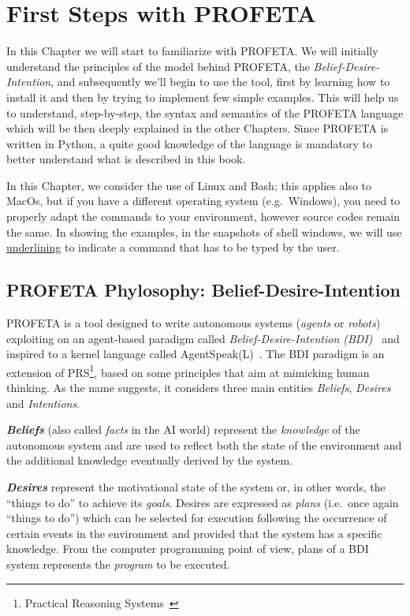 \chapter{First Steps with PROFETA}
In this Chapter we will start to familiarize with PROFETA.
We will initially understand the principles of the model behind PROFETA, the
\emph{Belief-Desire-Intention}, and subsequently we'll begin to use the
tool, first by learning how to install it and then by trying to implement
few simple examples.
This will help us to understand, step-by-step, the syntax and semantics of
the PROFETA language which will be then deeply explained in the other
Chapters.
Since PROFETA is written in Python, a quite good knowledge of the language
is mandatory to better understand what is described in this book.

In this Chapter, we consider the use of Linux and Bash; this applies also
to MacOs, but if you
have a different operating system (e.g.~Windows), you need to properly
adapt the commands to your environment, however source codes remain the
same.
In showing the examples, in the snapshots of shell windows, we will use
\underline{underlining} to indicate a command that has to be typed by the
user.



\section{PROFETA Phylosophy: Belief-Desire-Intention}
PROFETA is a tool designed to write autonomous systems (\emph{agents} or
\emph{robots}) exploiting on an
agent-based paradigm called
\emph{Belief-Desire-Intention (BDI)}~\cite{rao1995bdi} and inspired to a
kernel language called AgentSpeak(L)~\cite{AgentSpeak}.
The BDI paradigm is an extension of PRS\footnote{Practical Reasoning
  Systems~\cite{PRSarchitecture}}, based on some principles that aim at
mimicking human thinking.
As the name suggests, it considers three main entities \emph{Beliefs},
\emph{Desires} and \emph{Intentions}.

\textbf{\emph{Beliefs}} (also called \emph{facts} in the AI world)
represent the
\emph{knowledge} of the autonomous system and
are used to reflect both the state of the environment and the additional
knowledge eventually derived by the system.

\textbf{\emph{Desires}} represent the motivational state of the system or,
in other words, the ``things to do'' to achieve its \emph{goals}.
Desires are expressed as \emph{plans} (i.e.~once again
``things to do'') which can be selected for execution following the
occurrence of certain
events in the environment and provided that the system has a specific
knowledge.
From the computer programming point of view, plans of a BDI system
represents the \emph{program} to be executed.

